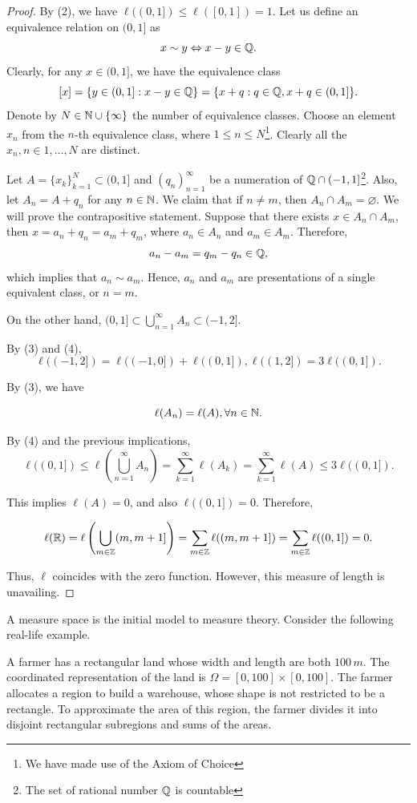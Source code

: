 \begin{proof}
 By (2), we have $\ell((0,1])\le \ell([0,1]) = 1$. Let us define an equivalence relation  on $(0,1]$ as
 $$x\sim y \Leftrightarrow x-y\in\mathbb{Q}.$$
 Clearly, for any $x\in (0,1]$, we have the equivalence class
 $$[x] = \{y\in(0,1] : x-y\in \mathbb{Q}\} = \{x+q: q\in \mathbb{Q}, x+q\in (0,1]\}.$$
 Denote by $N\in\mathbb{N}\cup\{\infty\}$ the number of equivalence classes. Choose an element $x_n$ from the $n$-th equivalence class, where $1\le n\le N$\footnote{We have made use of the Axiom of Choice}. Clearly all the $x_n, n\in1,\ldots, N$ are distinct.

 Let $A=\{x_k\}_{k=1}^N\subset(0,1]$ and $(q_n)_{n=1}^\infty$ be a numeration of $\mathbb{Q}\cap(-1,1]$\footnote{The set of rational number $\mathbb{Q}$ is countable}. Also, let $A_n = A + q_n$ for any $n\in\mathbb{N}$. We claim that if $n\neq m$, then $A_n\cap A_m = \varnothing$. We will prove the contrapositive statement. Suppose that there exists $x\in A_n\cap A_m$, then $x=a_n + q_n = a_m + q_m$, where $a_n\in A_n$ and $a_m\in A_m$. Therefore,
 $$a_n-a_m = q_m-q_n\in \mathbb{Q},$$
 which implies that $a_n\sim a_m$. Hence, $a_n$ and $a_m$ are presentations of a single equivalent class, or $n=m$.

 On the other hand, $(0,1] \subset \bigcup\limits_{n=1}^\infty A_n \subset (-1,2]$.

 By (3) and (4),
 $$\ell((-1,2]) = \ell((-1,0]) + \ell((0,1]), \ell((1,2]) = 3\ell((0,1]).$$

 By (3), we have

 $$\ell(A_n) = \ell (A), \forall n\in\mathbb{N}.$$

 By (4) and the previous implications,
 $$\ell((0,1]) \le \ell\left(\bigcup\limits_{n=1}^\infty A_n\right) = \sum\limits_{k=1}^{\infty} \ell(A_k) = \sum_{k=1}^{\infty} \ell(A) \le 3\ell((0,1]).$$

 This implies $\ell(A)=0$, and also $\ell((0,1])=0$. Therefore,

 $$\ell(\mathbb{R}) = \ell\left(\bigcup\limits_{m\in\mathbb{Z}}(m,m+1] \right) = \sum\limits_{m\in\mathbb{Z}} \ell((m,m+1])= \sum\limits_{m\in\mathbb{Z}} \ell((0,1]) = 0.$$

 Thus, $\ell$ coincides with the zero function. However, this measure of length is unavailing.
\end{proof}


A measure space is the initial model to measure theory. Consider the following real-life example.

\begin{example}
 A farmer has a rectangular land whose width and length are both $100\,m$. The coordinated representation of the land is $\Omega=[0,100]\times[0,100]$. The farmer allocates a region to build a warehouse, whose shape is not restricted to be a rectangle. To approximate the area of this region, the farmer divides it into disjoint rectangular subregions and sums of the areas.
\end{example}

